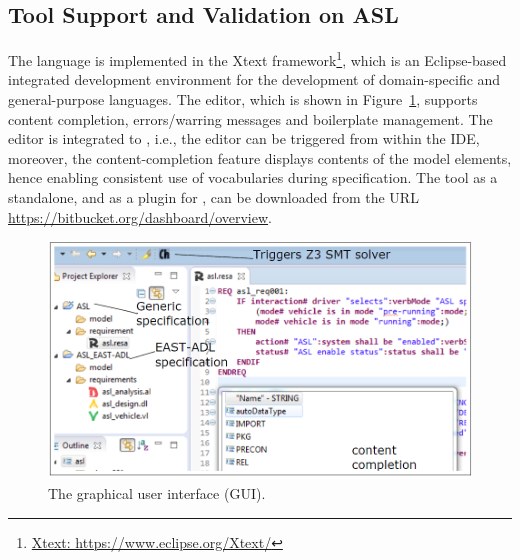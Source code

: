 \subsection*{Tool Support and Validation on ASL}
The language is implemented in the Xtext framework\footnote{\url{Xtext: https://www.eclipse.org/Xtext/}}, which is an Eclipse-based integrated development environment for the development of domain-specific and general-purpose languages. The \resa{} editor, which is shown in Figure~\ref{fig_resagui}, supports content completion, errors/warring messages and boilerplate management. The editor is integrated to \eatop, i.e., the editor can be triggered from within the IDE, moreover, the content-completion feature displays contents of the \eastadl{} model elements, hence enabling consistent use of vocabularies during specification. The \resa{} tool as a standalone, and as a plugin for \eatop{}, can be downloaded from the URL {\small \url{https://bitbucket.org/dashboard/overview}}. 
\begin{figure}[h]
	\centering
	\includegraphics[width=1\linewidth]{images/resagui}
	\caption{The \resa{} graphical user interface (GUI).}
	\label{fig_resagui}
\end{figure}

